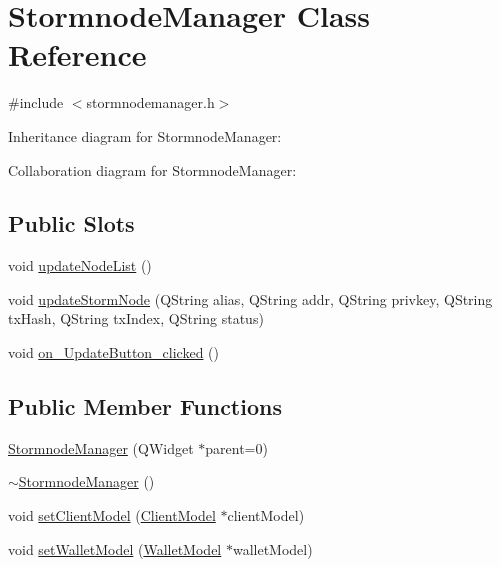 \hypertarget{class_stormnode_manager}{}\section{Stormnode\+Manager Class Reference}
\label{class_stormnode_manager}


{\ttfamily \#include $<$stormnodemanager.\+h$>$}



Inheritance diagram for Stormnode\+Manager\+:


Collaboration diagram for Stormnode\+Manager\+:
\subsection*{Public Slots}
\begin{DoxyCompactItemize}
\item 
void \hyperlink{class_stormnode_manager_a5cba8d5a6fda3cb986372678f766170f}{update\+Node\+List} ()
\item 
void \hyperlink{class_stormnode_manager_a44edd7083dc8e92e1083b492e781513b}{update\+Storm\+Node} (Q\+String alias, Q\+String addr, Q\+String privkey, Q\+String tx\+Hash, Q\+String tx\+Index, Q\+String status)
\item 
void \hyperlink{class_stormnode_manager_a8176df10b7594a5d37aeb8d41941a52b}{on\+\_\+\+Update\+Button\+\_\+clicked} ()
\end{DoxyCompactItemize}
\subsection*{Public Member Functions}
\begin{DoxyCompactItemize}
\item 
\hyperlink{class_stormnode_manager_abbf5b0f2ae3578d576182fe7a3a92488}{Stormnode\+Manager} (Q\+Widget $\ast$parent=0)
\item 
\hyperlink{class_stormnode_manager_ab11545626564a6297afa91ef575a6fd9}{$\sim$\+Stormnode\+Manager} ()
\item 
void \hyperlink{class_stormnode_manager_ab44da43c24ef293ea3c548883d270f99}{set\+Client\+Model} (\hyperlink{class_client_model}{Client\+Model} $\ast$client\+Model)
\item 
void \hyperlink{class_stormnode_manager_a624b7c64eed1e9691733bd9473e98344}{set\+Wallet\+Model} (\hyperlink{class_wallet_model}{Wallet\+Model} $\ast$wallet\+Model)
\end{DoxyCompactItemize}


